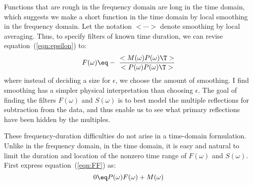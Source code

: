 \par
Functions that are rough in the frequency domain are long in the time domain,
which suggests we make a short function in the time domain
by local smoothing in the frequency domain.
Let the notation $< \cdots >$ denote smoothing by local averaging.
Thus,
to specify filters of known time duration,
we can revise equation~(\ref{eqn:epsilon}) to:
\begin{equation}
F(\omega )\eq
- \ {<M(\omega ) P(\omega )\T> \over <P(\omega )P(\omega )\T  >}
\label{eqn:smoothit}
\end{equation}
where
instead of deciding a size for $\epsilon$,
we choose the amount of smoothing.
I find smoothing has a simpler physical interpretation than choosing 
$\epsilon$.
The goal of finding the filters $F(\omega )$ and $S(\omega )$ is to
best model the multiple reflections for subtraction from the data,
and thus enable us to see what primary reflections
have been hidden by the multiples.

\par
These frequency-duration difficulties do not arise in a time-domain formulation.
Unlike in the frequency domain,
in the time domain, it is easy and natural
to limit the duration and location
of the nonzero time range of $F(\omega)$ and $S(\omega)$.
First express
equation~(\ref{eqn:FF}) as:
\begin{equation}
0 \eq P(\omega )F(\omega ) +M(\omega )  
\label{eqn:floor}
\end{equation}

